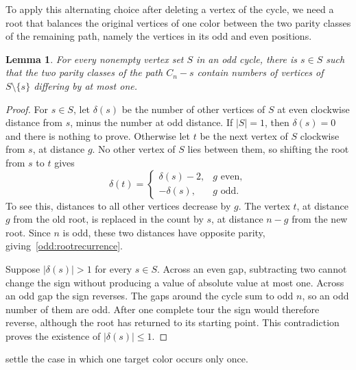 \documentclass[11pt,reqno]{amsart}
\numberwithin{equation}{section}
\newtheorem{lemma}[theorem]{Lemma}
\theoremstyle{definition}
\theoremstyle{remark}
\begin{document}
To apply this alternating choice after deleting a vertex of the cycle,
we need a root that balances the original vertices of one color between
the two parity classes of the remaining path, namely the vertices in
its odd and even positions.

\begin{lemma}\label{odd:root}
For every nonempty vertex set $S$ in an odd cycle, there is $s\in S$
such that the two parity classes of the path $C_n-s$ contain
numbers of vertices of $S\setminus\{s\}$ differing by at most one.
\end{lemma}
\begin{proof}
For $s\in S$, let $\delta(s)$ be the number of other vertices of $S$
at even clockwise distance from $s$, minus the number at odd distance.
If $|S|=1$, then $\delta(s)=0$ and there is nothing to prove.
Otherwise let $t$ be the next vertex of $S$ clockwise from $s$, at
distance $g$. No other vertex of $S$ lies between them, so shifting
the root from $s$ to $t$ gives
\begin{equation}\label{odd:rootrecurrence}
\delta(t)=
\begin{cases}
\delta(s)-2,&g\text{ even},\\
-\delta(s),&g\text{ odd}.
\end{cases}
\end{equation}
To see this, distances to all other vertices decrease by $g$.
The vertex $t$, at distance $g$ from the old root, is replaced in the
count by $s$, at distance $n-g$ from the new root. Since $n$ is odd,
these two distances have opposite parity, giving~\eqref{odd:rootrecurrence}.

Suppose $|\delta(s)|>1$ for every $s\in S$. Across an even gap,
subtracting two cannot change the sign without producing a value
of absolute value at most one. Across an odd gap the sign reverses.
The gaps around the cycle sum to odd $n$, so an odd number of them
are odd. After one complete tour the sign would therefore reverse,
although the root has returned to its starting point. This
contradiction proves the existence of $|\delta(s)|\le1$.
\end{proof}

 settle the case in which one
target color occurs only once.
\end{document}
